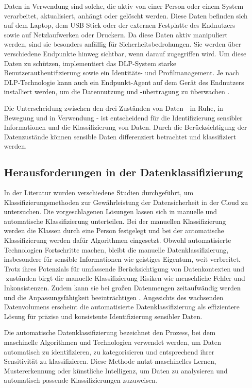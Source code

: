 Daten in Verwendung sind solche, die aktiv von einer Person oder einem System verarbeitet, aktualisiert, anhängt oder gelöscht werden. Diese Daten befinden sich auf dem Laptop, dem USB-Stick oder der externen Festplatte des Endnutzers sowie auf Netzlaufwerken oder Druckern. Da diese Daten aktiv manipuliert werden, sind sie besonders anfällig für Sicherheitsbedrohungen. Sie werden über verschiedene Endpunkte hinweg sichtbar, wenn darauf zugegriffen wird. Um diese Daten zu schützen, implementiert das DLP-System starke Benutzerauthentifizierung sowie ein Identitäts- und Profilmanagement. Je nach DLP-Technologie kann auch ein Endpunkt-Agent auf dem Gerät des Endnutzers installiert werden, um die Datennutzung und -übertragung zu überwachen \cite{Shishodia.2022}\cite{Shabtai.2012b}.

Die Unterscheidung zwischen den drei Zuständen von Daten - in Ruhe, in Bewegung und in Verwendung - ist entscheidend für die Identifizierung sensibler Informationen und die Klassifizierung von Daten. Durch die Berücksichtigung der Datenzustände können sensible Daten differenziert betrachtet und klassifiziert werden.

\subsection{Herausforderungen in der Datenklassifizierung}
In der Literatur wurden verschiedene Studien durchgeführt, um Klassifizierungsmethoden zur Gewährleistung der Datensicherheit in der Cloud zu untersuchen. Die vorgeschlagenen Lösungen lassen sich in manuelle und automatische Klassifizierung unterteilen. Bei der manuellen Klassifizierung werden die Klassen durch eine Person festgelegt und bei der automatische Klassifizierung werden dafür Algorithmen eingesetzt. Obwohl automatisierte Technologien Fortschritte machen, bleibt die manuelle Datenklassifizierung, insbesondere für sensible Informationen wie geistiges Eigentum, weit verbreitet. Trotz ihres Potenzials für umfassende Berücksichtigung von Datenkontexten und -zuständen birgt die manuelle Klassifizierung Risiken wie menschliche Fehler und Inkonsistenzen. Zudem kann sie bei großen Datenmengen zeitaufwändig werden und die Anpassungsfähigkeit beeinträchtigen \cite{Venhorst.2019}. Angesichts des wachsenden Datenvolumens erscheint die automatisierte Datenklassifizierung als effizientere Lösung für präzise und konsistente Identifizierung sensibler Daten.

Die automatische Datenklassifizierung bezeichnet den Prozess, bei dem maschinelle Algorithmen und Technologien verwendet werden, um Daten automatisch zu identifizieren, zu kategorisieren und entsprechend ihrer Sensitivität zu klassifizieren. Diese Methode nutzt maschinelles Lernen, Mustererkennung oder künstliche Intelligenz, um Daten zu analysieren und automatisch passende Klassifizierungen zuzuweisen.

